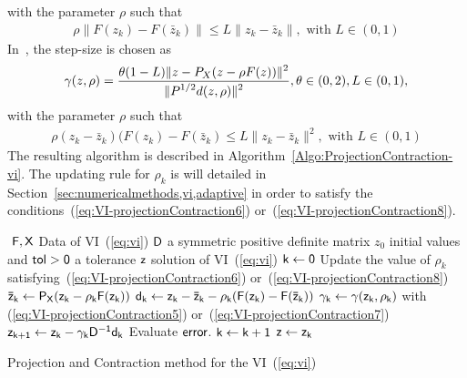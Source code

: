 with the parameter $\rho$ such that
\begin{equation}
  \label{eq:VI-projectionContraction6}
  \begin{array}{lcl}
    \rho \|F(z_k) - F(\bar z_k)\| \leq L \|z_k - \bar z_k\|, \text{ with } L \in (0,1)
  \end{array}
\end{equation}
In~\citep{Solodov.Tseng1996}, the step-size is chosen as
\begin{equation}
  \label{eq:VI-projectionContraction7}
  \begin{array}{lcl}
    \gamma (z,\rho) = \Frac{\theta (1-L) \| z - P_X(z-\rho F(z))\|^2} {\|P^{1/2}d(z,\rho)\|^2}, \theta \in (0,2), L\in (0,1),
  \end{array}
\end{equation}
with the parameter $\rho$ such that
\begin{equation}
  \label{eq:VI-projectionContraction8}
  \begin{array}{lcl}
    \rho (z_k-\bar z_k)(F(z_k) - F(\bar z_k) \leq L \|z_k - \bar z_k\|^2, \text{ with } L \in (0,1)
  \end{array}
\end{equation}
The resulting algorithm is described in Algorithm~\ref{Algo:ProjectionContraction-vi}. The updating rule for $\rho_k$ is will detailed in Section~\ref{sec:numericalmethods,vi,adaptive} in order to satisfy the conditions~(\ref{eq:VI-projectionContraction6}) or~(\ref{eq:VI-projectionContraction8}).


\begin{algorithm}
  \begin{algorithmic}
    {\sf
      \STATE $ $
      \REQUIRE $\sf F,X$ Data of VI~(\ref{eq:vi})
      \REQUIRE $\sf D$ a symmetric positive definite matrix
      \REQUIRE $z_0$ initial values and $\sf tol >0$ a tolerance
      \ENSURE  $\sf z$ solution of VI~(\ref{eq:vi})
      \STATE   $\sf k \leftarrow 0$ 
      \STATE Update the value of $\rho_k$ satisfying~(\ref{eq:VI-projectionContraction6}) or~(\ref{eq:VI-projectionContraction8})
      \STATE $\sf \bar z_{k} \leftarrow P_X(z_k-\rho_k F(z_k))$
      \STATE $\sf d_k  \leftarrow  z_k - \bar z_k - \rho_k (F(z_k) - F(\bar z_k)) $
      \STATE $\sf \gamma_k \leftarrow \gamma(z_k,\rho_k)$ with (\ref{eq:VI-projectionContraction5}) or~(\ref{eq:VI-projectionContraction7})
      \STATE $\sf z_{k+1} \leftarrow  z_k - \gamma_k D^{-1} d_k$
      \STATE Evaluate $\sf error$.
      \STATE $\sf k \leftarrow k+1$
      \ENDWHILE
      \STATE $\sf z \leftarrow z_{k}$ 
    }
  \end{algorithmic}
  \caption{Projection and Contraction method for the VI~(\ref{eq:vi})}  \label{Algo:ProjectionContraction-vi}
\end{algorithm}

